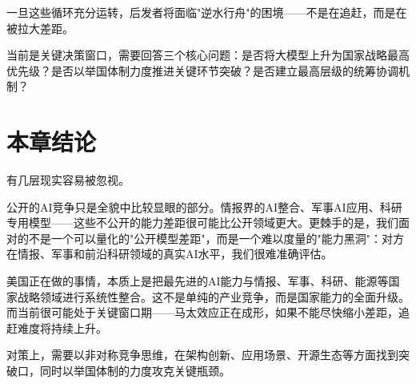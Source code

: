 一旦这些循环充分运转，后发者将面临"逆水行舟"的困境——不是在追赶，而是在被拉大差距。

当前是关键决策窗口，需要回答三个核心问题：是否将大模型上升为国家战略最高优先级？是否以举国体制力度推进关键环节突破？是否建立最高层级的统筹协调机制？

\section{本章结论}

有几层现实容易被忽视。

公开的AI竞争只是全貌中比较显眼的部分。情报界的AI整合、军事AI应用、科研专用模型——这些不公开的能力差距很可能比公开领域更大。更棘手的是，我们面对的不是一个可以量化的"公开模型差距"，而是一个难以度量的"能力黑洞"：对方在情报、军事和前沿科研领域的真实AI水平，我们很难准确评估。

美国正在做的事情，本质上是把最先进的AI能力与情报、军事、科研、能源等国家战略领域进行系统性整合。这不是单纯的产业竞争，而是国家能力的全面升级。而当前很可能处于关键窗口期——马太效应正在成形，如果不能尽快缩小差距，追赶难度将持续上升。

对策上，需要以非对称竞争思维，在架构创新、应用场景、开源生态等方面找到突破口，同时以举国体制的力度攻克关键瓶颈。

